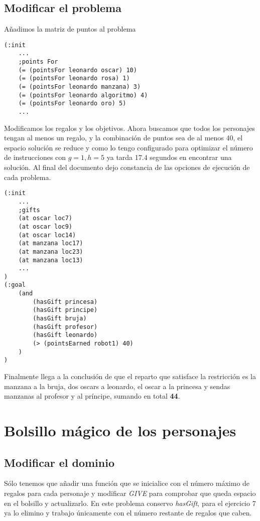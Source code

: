 \documentclass{article}
\newcommand{\img}[1]{
\noindent\makebox[0.9\textwidth][c]{\texttt{[image: \#1]}}%
}
\begin{document}
\subsection{Modificar el problema}

Añadimos la matriz de puntos al problema

\begin{lstlisting}
(:init
    ...
    ;points For
    (= (pointsFor leonardo oscar) 10)
    (= (pointsFor leonardo rosa) 1)
    (= (pointsFor leonardo manzana) 3)
    (= (pointsFor leonardo algoritmo) 4)
    (= (pointsFor leonardo oro) 5)
    ...
\end{lstlisting}

Modificamos los regalos y los objetivos. Ahora buscamos que todos los personajes tengan al menos un regalo, y la combinación de puntos sea de al menos 40, el espacio solución se reduce y como lo tengo configurado para optimizar el número de instrucciones con $g=1,h=5$ ya tarda 17.4 segundos en encontrar una solución. Al final del documento dejo constancia de las opciones de ejecución de cada problema.

\begin{lstlisting}
(:init
    ...
    ;gifts
    (at oscar loc7)
    (at oscar loc9)
    (at oscar loc14)
    (at manzana loc17)
    (at manzana loc23)
    (at manzana loc13)
    ...
)
(:goal 
	(and
        (hasGift princesa)
        (hasGift principe)
        (hasGift bruja)
        (hasGift profesor)
        (hasGift leonardo)
        (> (pointsEarned robot1) 40)
    )
)
\end{lstlisting}

\img{img/map4}

Finalmente llega a la conclusión de que el reparto que satisface la restricción es la manzana a la bruja, dos oscars a leonardo, el oscar a la princesa y sendas manzanas al profesor y al príncipe, sumando en total \textbf{44}.

\section{Bolsillo mágico de los personajes}

\subsection{Modificar el dominio}

Sólo tenemos que añadir una función que se inicialice con el número máximo de regalos para cada personaje y modificar \emph{GIVE} para comprobar que queda espacio en el bolsillo y actualizarlo. En este problema conservo \emph{hasGift}, para el ejercicio 7 ya lo elimino y trabajo únicamente con el número restante de regalos que caben.
\end{document}
